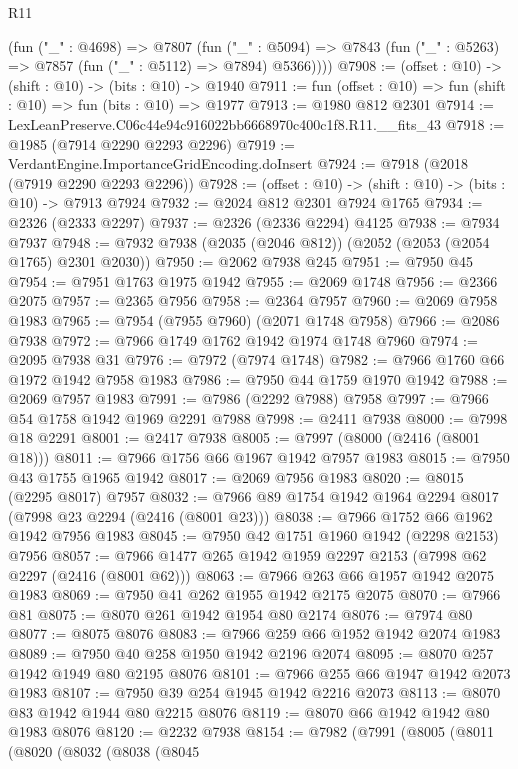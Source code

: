 \begin{lexlean}{R11}
\begin{coremodule}
      (fun ("_" : @4698) =>
      @7807
        (fun ("_" : @5094) =>
        @7843 (fun ("_" : @5263) => @7857 (fun ("_" : @5112) => @7894) @5366))))
@7908 := (offset : @10) -> (shift : @10) -> (bits : @10) -> @1940
@7911 := fun (offset : @10) => fun (shift : @10) => fun (bits : @10) => @1977
@7913 := @1980 @812 @2301
@7914 := LexLeanPreserve.C06c44e94c916022bb6668970c400c1f8.R11.__fits_43
@7918 := @1985 (@7914 @2290 @2293 @2296)
@7919 := VerdantEngine.ImportanceGridEncoding.doInsert
@7924 := @7918 (@2018 (@7919 @2290 @2293 @2296))
@7928 := (offset : @10) -> (shift : @10) -> (bits : @10) -> @7913 @7924
@7932 := @2024 @812 @2301 @7924 @1765
@7934 := @2326 (@2333 @2297)
@7937 := @2326 (@2336 @2294) @4125
@7938 := @7934 @7937
@7948 := @7932 @7938 (@2035 (@2046 @812)) (@2052 (@2053 (@2054 @1765) @2301 @2030))
@7950 := @2062 @7938 @245
@7951 := @7950 @45
@7954 := @7951 @1763 @1975 @1942
@7955 := @2069 @1748
@7956 := @2366 @2075
@7957 := @2365 @7956
@7958 := @2364 @7957
@7960 := @2069 @7958 @1983
@7965 := @7954 (@7955 @7960) (@2071 @1748 @7958)
@7966 := @2086 @7938
@7972 := @7966 @1749 @1762 @1942 @1974 @1748 @7960
@7974 := @2095 @7938 @31
@7976 := @7972 (@7974 @1748)
@7982 := @7966 @1760 @66 @1972 @1942 @7958 @1983
@7986 := @7950 @44 @1759 @1970 @1942
@7988 := @2069 @7957 @1983
@7991 := @7986 (@2292 @7988) @7958
@7997 := @7966 @54 @1758 @1942 @1969 @2291 @7988
@7998 := @2411 @7938
@8000 := @7998 @18 @2291
@8001 := @2417 @7938
@8005 := @7997 (@8000 (@2416 (@8001 @18)))
@8011 := @7966 @1756 @66 @1967 @1942 @7957 @1983
@8015 := @7950 @43 @1755 @1965 @1942
@8017 := @2069 @7956 @1983
@8020 := @8015 (@2295 @8017) @7957
@8032 := @7966 @89 @1754 @1942 @1964 @2294 @8017 (@7998 @23 @2294 (@2416 (@8001 @23)))
@8038 := @7966 @1752 @66 @1962 @1942 @7956 @1983
@8045 := @7950 @42 @1751 @1960 @1942 (@2298 @2153) @7956
@8057 := @7966 @1477 @265 @1942 @1959 @2297 @2153 (@7998 @62 @2297 (@2416 (@8001 @62)))
@8063 := @7966 @263 @66 @1957 @1942 @2075 @1983
@8069 := @7950 @41 @262 @1955 @1942 @2175 @2075
@8070 := @7966 @81
@8075 := @8070 @261 @1942 @1954 @80 @2174
@8076 := @7974 @80
@8077 := @8075 @8076
@8083 := @7966 @259 @66 @1952 @1942 @2074 @1983
@8089 := @7950 @40 @258 @1950 @1942 @2196 @2074
@8095 := @8070 @257 @1942 @1949 @80 @2195 @8076
@8101 := @7966 @255 @66 @1947 @1942 @2073 @1983
@8107 := @7950 @39 @254 @1945 @1942 @2216 @2073
@8113 := @8070 @83 @1942 @1944 @80 @2215 @8076
@8119 := @8070 @66 @1942 @1942 @80 @1983 @8076
@8120 := @2232 @7938
@8154 := @7982
    (@7991
      (@8005
        (@8011
          (@8020
            (@8032
              (@8038
                (@8045

\end{coremodule}
\end{lexlean}
